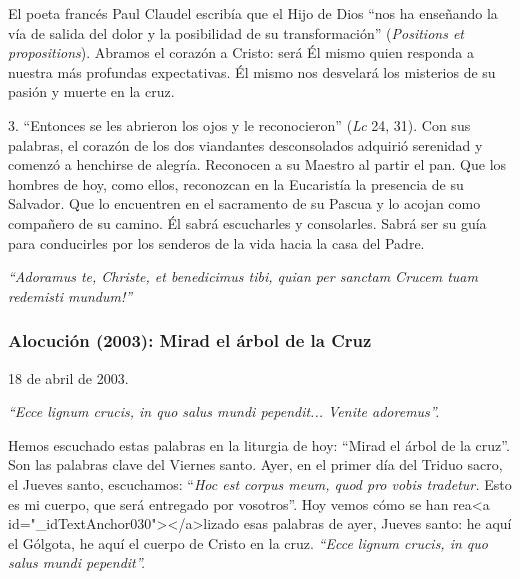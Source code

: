 			\begin{body}El poeta francés Paul Claudel escribía que el Hijo de Dios “nos ha enseñando la vía de salida del dolor y la posibilidad de su transformación” (\textit{Positions et propositions}). Abramos el corazón a Cristo: será Él mismo quien responda a nuestra más profundas expectativas. Él mismo nos desvelará los misterios de su pasión y muerte en la cruz.\end{body}
			
			\begin{body}3. “Entonces se les abrieron los ojos y le reconocieron” (\textit{Lc} 24, 31). Con sus palabras, el corazón de los dos viandantes desconsolados adquirió serenidad y comenzó a henchirse de alegría. Reconocen a su Maestro al partir el pan. Que los hombres de hoy, como ellos, reconozcan en la Eucaristía la presencia de su Salvador. Que lo encuentren en el sacramento de su Pascua y lo acojan como compañero de su camino. Él sabrá escucharles y consolarles. Sabrá ser su guía para conducirles por los senderos de la vida hacia la casa del Padre.\end{body}
			
			\begin{body}\textit{“Adoramus te, Christe, et benedicimus tibi, quian per sanctam Crucem tuam redemisti mundum!”}\end{body}
			
			\subsubsection{Alocución (2003): Mirad el árbol de la Cruz}
			
			\begin{referencia}18 de abril de 2003.\end{referencia}
			
			\begin{body}\textit{“Ecce lignum crucis, in quo salus mundi pependit... Venite adoremus”.}\end{body}
			
			\begin{body}Hemos escuchado estas palabras en la liturgia de hoy: “Mirad el árbol de la cruz”. Son las palabras clave del Viernes santo. Ayer, en el primer día del Triduo sacro, el Jueves santo, escuchamos:\textit{ }“\textit{Hoc est corpus meum, quod pro vobis tradetur. }Esto es mi cuerpo, que será entregado por vosotros”. Hoy vemos cómo se han rea<a id="_idTextAnchor030"></a>lizado esas palabras de ayer, Jueves santo: he aquí el Gólgota, he aquí el cuerpo de Cristo en la cruz. \textit{“Ecce lignum crucis, in quo salus mundi pependit”.}\end{body}
			
